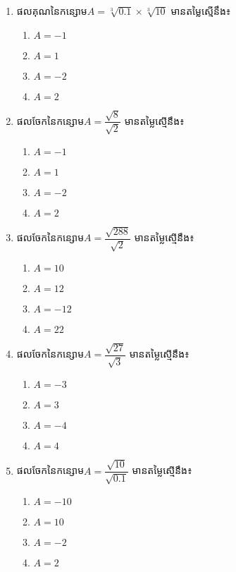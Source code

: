 \begin{enumerate}
\item ផលគុណនៃកន្សោម$A=\sqrt[3]{0.1}\times \sqrt[3]{10}$  មានតម្លៃស្មើនឹង៖
\begin{multicols}{4}
\begin{enumerate}[label=\alph*.]
	\item $A=-1$
	\item $A=1$
	\item $A=-2$
	\item $A=2$
\end{enumerate}
\end{multicols}

\item ផលចែកនៃកន្សោម$A=\dfrac{\sqrt{8}}{\sqrt{2}}$  មានតម្លៃស្មើនឹង៖
\begin{multicols}{4}
\begin{enumerate}[label=\alph*.]
	\item $A=-1$
	\item $A=1$
	\item $A=-2$
	\item $A=2$
\end{enumerate}
\end{multicols}

\item ផលចែកនៃកន្សោម$A=\dfrac{\sqrt{288}}{\sqrt{2}}$  មានតម្លៃស្មើនឹង៖
\begin{multicols}{4}
\begin{enumerate}[label=\alph*.]
	\item $A=10$
	\item $A=12$
	\item $A=-12$
	\item $A=22$
\end{enumerate}
\end{multicols}

\item ផលចែកនៃកន្សោម$A=\dfrac{\sqrt{27}}{\sqrt{3}}$  មានតម្លៃស្មើនឹង៖
\begin{multicols}{4}
\begin{enumerate}[label=\alph*.]
	\item $A=-3$
	\item $A=3$
	\item $A=-4$
	\item $A=4$
\end{enumerate}
\end{multicols}

\item ផលចែកនៃកន្សោម$A=\dfrac{\sqrt{10}}{\sqrt{0.1}}$  មានតម្លៃស្មើនឹង៖
\begin{multicols}{4}
\begin{enumerate}[label=\alph*.]
	\item $A=-10$
	\item $A=10$
	\item $A=-2$
	\item $A=2$
\end{enumerate}
\end{multicols}


\end{enumerate}
